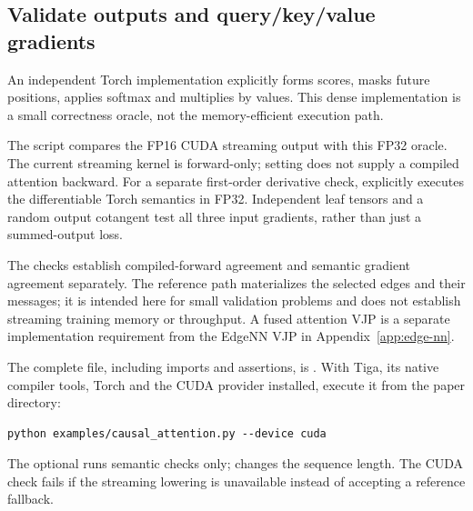 \subsection{Validate outputs and query/key/value gradients}
An independent Torch implementation explicitly forms scores, masks future
positions, applies softmax and multiplies by values. This dense implementation
is a small correctness oracle, not the memory-efficient execution path.


The script compares the FP16 CUDA streaming output with this FP32 oracle.
The current streaming kernel is forward-only; setting
 does not supply a compiled attention backward.
For a separate first-order derivative check, 
explicitly executes the differentiable Torch semantics in FP32. Independent
leaf tensors and a random output cotangent test all three input gradients,
rather than just a summed-output loss.


The checks establish compiled-forward agreement and semantic gradient
agreement separately. The reference path materializes the selected edges and
their messages; it is intended here for small validation problems and does
not establish streaming training memory or throughput. A fused attention VJP
is a separate implementation requirement from the EdgeNN VJP in
Appendix~\ref{app:edge-nn}.

The complete file, including imports and assertions, is
\href{https://github.com/walkerchi/tiga-lang-paper/blob/main/examples/causal_attention.py}{}.
With Tiga, its native compiler tools, Torch and the CUDA provider installed,
execute it from the paper directory:
\begin{lstlisting}[language=TigaShell]
python examples/causal_attention.py --device cuda
\end{lstlisting}
The optional  runs semantic checks only;
 changes the sequence length. The CUDA check fails if the
streaming lowering is unavailable instead of accepting a reference fallback.
